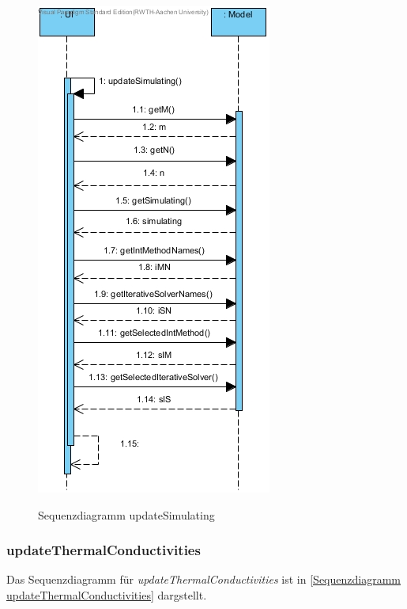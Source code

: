 \begin{figure}[H]
	\centering
	\includegraphics[scale=.6]{Bilder/UI__updateSimulating().jpg}\\
	\caption{Sequenzdiagramm updateSimulating}
	\label{Sequenzdiagramm updateSimulating}
\end{figure}

\subsubsection*{updateThermalConductivities}

Das Sequenzdiagramm für \emph{updateThermalConductivities} ist in \ref{Sequenzdiagramm updateThermalConductivities} dargstellt.

